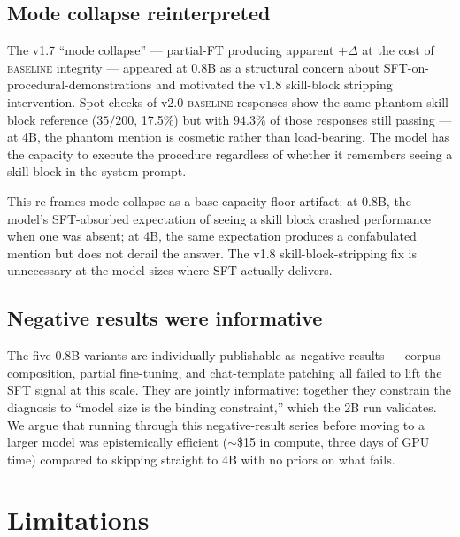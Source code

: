 \documentclass[10pt]{article}
\newcommand{\BL}{\textsc{baseline}\xspace}
\begin{document}
\subsection{Mode collapse reinterpreted}
The v1.7 ``mode collapse'' --- partial-FT producing apparent $+\Delta$ at the cost of \BL{} integrity --- appeared at 0.8B as a structural concern about SFT-on-procedural-demonstrations and motivated the v1.8 skill-block stripping intervention. Spot-checks of v2.0 \BL{} responses show the same phantom skill-block reference ($35/200$, 17.5\%) but with $94.3\%$ of those responses still passing --- at 4B, the phantom mention is cosmetic rather than load-bearing. The model has the capacity to execute the procedure regardless of whether it remembers seeing a skill block in the system prompt.

This re-frames mode collapse as a base-capacity-floor artifact: at 0.8B, the model's SFT-absorbed expectation of seeing a skill block crashed performance when one was absent; at 4B, the same expectation produces a confabulated mention but does not derail the answer. The v1.8 skill-block-stripping fix is unnecessary at the model sizes where SFT actually delivers.

\subsection{Negative results were informative}
The five 0.8B variants are individually publishable as negative results --- corpus composition, partial fine-tuning, and chat-template patching all failed to lift the SFT signal at this scale. They are jointly informative: together they constrain the diagnosis to ``model size is the binding constraint,'' which the 2B run validates. We argue that running through this negative-result series before moving to a larger model was epistemically efficient ($\sim$\$15 in compute, three days of GPU time) compared to skipping straight to 4B with no priors on what fails.

\section{Limitations}
\end{document}
